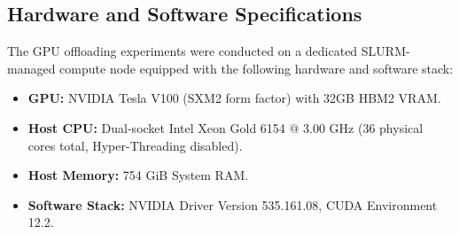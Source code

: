 \documentclass[conference]{IEEEtran}
\begin{document}
\subsection{Hardware and Software Specifications}
The GPU offloading experiments were conducted on a dedicated SLURM-managed compute node equipped with the following hardware and software stack:
\begin{itemize}
    \item \textbf{GPU:} NVIDIA Tesla V100 (SXM2 form factor) with 32GB HBM2 VRAM.
    \item \textbf{Host CPU:} Dual-socket Intel Xeon Gold 6154 @ 3.00 GHz (36 physical cores total, Hyper-Threading disabled).
    \item \textbf{Host Memory:} 754 GiB System RAM.
    \item \textbf{Software Stack:} NVIDIA Driver Version 535.161.08, CUDA Environment 12.2.
\end{itemize}
\end{document}
